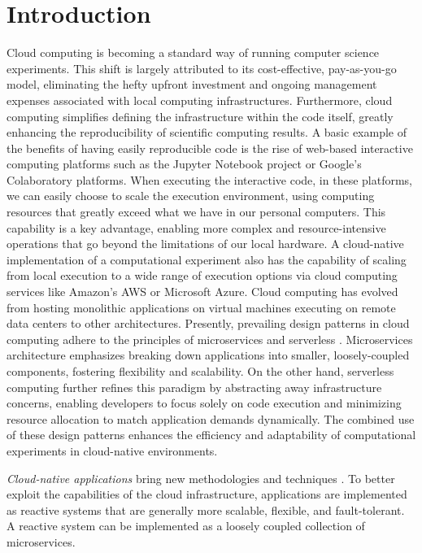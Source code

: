 \documentclass{cys}
\begin{document}
\section{Introduction}
\label{sec:introduction}

Cloud computing is becoming a standard way of running computer science experiments.  
This shift is largely attributed to its cost-effective, pay-as-you-go model, 
eliminating the hefty upfront investment and ongoing management expenses associated 
with local computing infrastructures. Furthermore, cloud computing simplifies defining
the infrastructure within the code itself, greatly enhancing the reproducibility 
of scientific computing results. A basic example of the benefits of having easily reproducible code is the rise of web-based 
interactive computing platforms such as the Jupyter Notebook project \cite{kluyver2016jupyter} 
or Google's Colaboratory \cite{carneiro2018performance} platforms.
When executing the interactive code, in these platforms, we can easily choose to scale the 
execution environment, using computing resources that greatly exceed what we have in 
our personal computers. This capability is a key advantage, enabling more complex and 
resource-intensive operations that go beyond the limitations of our local hardware.
A cloud-native implementation of a computational experiment also
has the capability of scaling from local execution to a wide range of execution options 
via cloud computing services like Amazon's AWS or Microsoft Azure. 
Cloud computing has evolved from hosting monolithic applications on virtual 
machines executing on remote data centers to other architectures. 
Presently, prevailing design patterns in cloud computing adhere to the principles of  
microservices \cite{microservices} and serverless \cite{varghese2018next}.
Microservices architecture \cite{malawski2017serverless} emphasizes breaking down
applications into smaller, loosely-coupled components, fostering flexibility and 
scalability. On the other hand, serverless computing further refines this paradigm by abstracting away 
infrastructure concerns, enabling developers to focus solely on code execution and 
minimizing resource allocation to match application demands dynamically. 
The combined use of these design patterns enhances the efficiency and adaptability of
computational experiments in cloud-native environments.

{\em Cloud-native applications} bring new methodologies and
techniques \cite{Baldini2016287}. To better exploit the capabilities of the cloud
infrastructure, applications are implemented as reactive systems \cite{boner2014reactive}
that are generally more scalable, flexible, and fault-tolerant. A reactive system can be
implemented as a loosely coupled collection of microservices.
\end{document}
